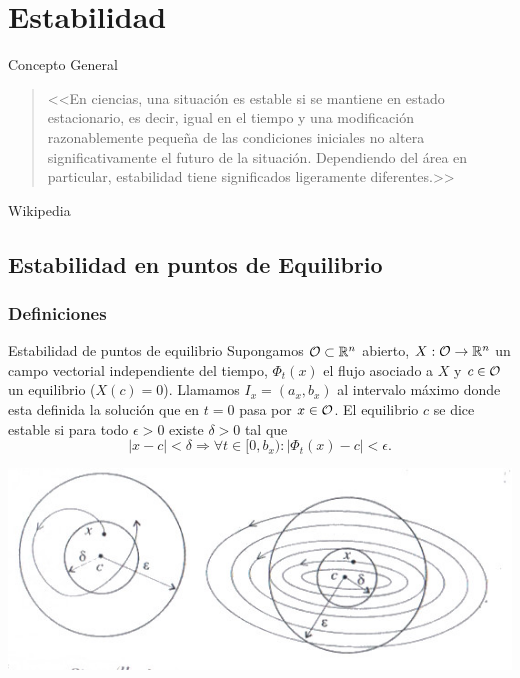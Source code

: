 

\chapter{Estabilidad}







{Concepto General}

\begin{quotation}
              
    <<En ciencias, una situación es estable si se mantiene en estado estacionario, es decir, igual en el tiempo 
    y una modificación razonablemente pequeña de las condiciones iniciales no altera significativamente  el
    futuro de la situación. Dependiendo del área en particular, estabilidad tiene significados ligeramente
    diferentes.>> 
    \end{quotation} 
    \begin{flushright}
     Wikipedia
    \end{flushright}



\section{Estabilidad en puntos de Equilibrio}

\subsection{Definiciones}

\begin{definicion}{Estabilidad de puntos de equilibrio} 
	      Supongamos $\mathcal{O}\subset\mathbb{R}^n$ abierto, $X:\mathcal{O}\to\mathbb{R}^n$ un campo vectorial independiente del tiempo, 
	      $\Phi_t(x)$ el flujo asociado a  $X$ 	      y $c\in \mathcal{O}$ 
	      un equilibrio ($X(c)=0$). Llamamos $I_x=(a_x,b_x)$ al intervalo máximo donde esta definida la solución 
	      que en $t=0$ pasa por $x\in\mathcal{O}$. El equilibrio $c$ se dice estable si para todo $\epsilon>0$ existe 
	      $\delta>0$ tal que 
	      \[|x-c|<\delta\Rightarrow \forall t\in [0,b_x):|\Phi_t(x)-c|<\epsilon.\]
\end{definicion}		
              
             





\begin{center}
  \includegraphics[scale=.5]{imagenes/circulo.jpg}
\end{center}

